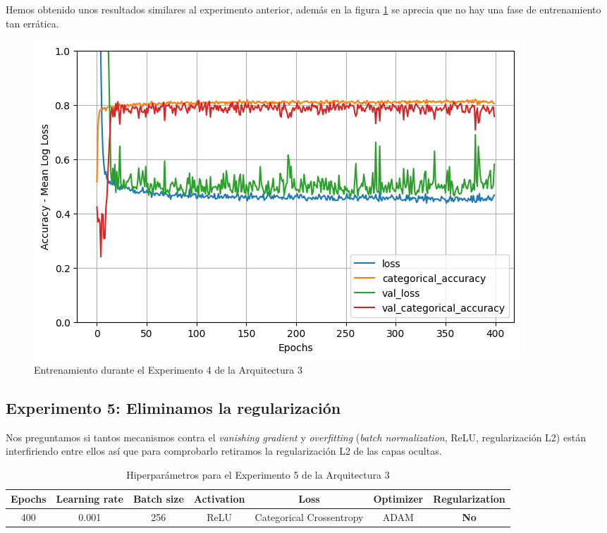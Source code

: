 \documentclass{article}
\begin{document}
			Hemos obtenido unos resultados similares al experimento anterior, adem\'as en la figura \ref{d-tr-a3-e4} se aprecia que no hay una fase de entrenamiento tan err\'atica.
			\begin{figure}[!h]
				\begin{center}
					\includegraphics[scale=0.5]{d-tr-a3-e4.png}		
					\caption{Entrenamiento durante el Experimento 4 de la Arquitectura 3}	
					\label{d-tr-a3-e4}
				\end{center}
			\end{figure}
			
		\subsection{Experimento 5: Eliminamos la regularizaci\'on}
		\label{d-s-a3-e5}
			Nos preguntamos si tantos mecanismos contra el \textit{vanishing gradient} y \textit{overfitting} (\textit{batch normalization}, ReLU, regularizaci\'on L2) est\'an interfiriendo entre ellos as\'i que para comprobarlo retiramos la regularizaci\'on L2 de las capas ocultas.
			\begin{table}[!h]
				\begin{tabular}{| c | c | c | c | c | c | c |}
					\textbf{Epochs} & \textbf{Learning rate} & \textbf{Batch size} & \textbf{Activation} & \textbf{Loss} & \textbf{Optimizer} & \textbf{Regularization} \\ \hline
					400 & 0.001 & 256 & ReLU & Categorical Crossentropy & ADAM & \textbf{No}
				\end{tabular}
				\caption{Hiperpar\'ametros para el Experimento 5 de la Arquitectura 3}
				\label{tab:hip-d-a3-e5}
			\end{table}
			
\end{document}

